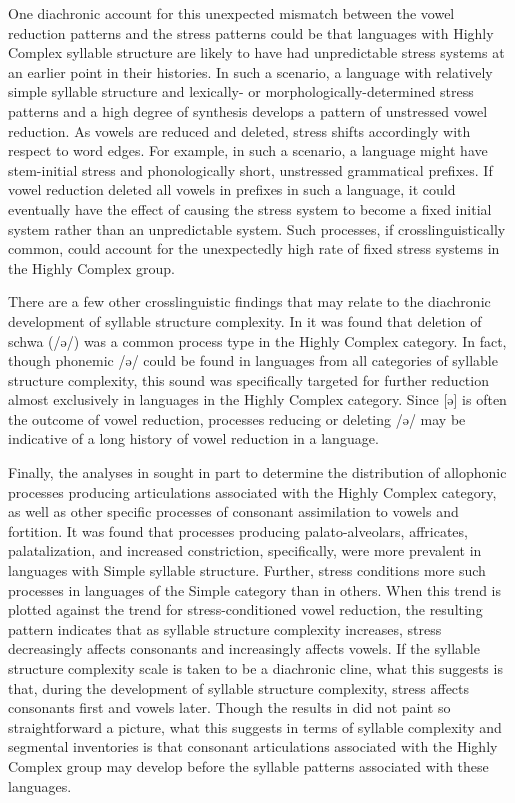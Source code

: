   One diachronic account for this unexpected mismatch between the vowel reduction patterns and the stress patterns could be that languages with Highly Complex syllable structure are likely to have had unpredictable stress systems at an earlier point in their histories. In such a scenario, a language with relatively simple syllable structure and lexically- or morphologically-determined stress patterns and a high degree of synthesis develops a pattern of unstressed vowel reduction. As vowels are reduced and deleted, stress shifts accordingly with respect to word edges. For example, in such a scenario, a language might have stem-initial stress and phonologically short, unstressed grammatical prefixes. If vowel reduction deleted all vowels in prefixes in such a language, it could eventually have the effect of causing the stress system to become a fixed initial system rather than an unpredictable system. Such processes, if crosslinguistically common, could account for the unexpectedly high rate of fixed stress systems in the Highly Complex group.

  There are a few other crosslinguistic findings that may relate to the diachronic development of syllable structure complexity. In  it was found that deletion of schwa (/ə/) was a common process type in the Highly Complex category. In fact, though phonemic /ə/ could be found in languages from all categories of syllable structure complexity, this sound was specifically targeted for further reduction almost exclusively in languages in the Highly Complex category. Since [ə] is often the outcome of vowel reduction, processes reducing or deleting /ə/ may be indicative of a long history of vowel reduction in a language.

  Finally, the analyses in  sought in part to determine the distribution of allophonic processes producing articulations associated with the Highly Complex category, as well as other specific processes of consonant assimilation to vowels and fortition. It was found that processes producing palato-alveolars, affricates, palatalization, and increased constriction, specifically, were more prevalent in languages with Simple syllable structure. Further, stress conditions more such processes in languages of the Simple category than in others. When this trend is plotted against the trend for stress-conditioned vowel reduction, the resulting pattern indicates that as syllable structure complexity increases, stress decreasingly affects consonants and increasingly affects vowels. If the syllable structure complexity scale is taken to be a diachronic cline, what this suggests is that, during the development of syllable structure complexity, stress affects consonants first and vowels later. Though the results in  did not paint so straightforward a picture, what this suggests in terms of syllable complexity and segmental inventories is that consonant articulations associated with the Highly Complex group may develop before the syllable patterns associated with these languages.

